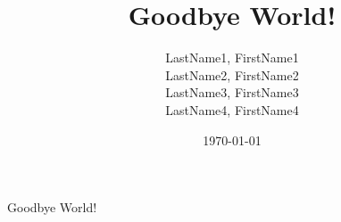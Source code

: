 \documentclass{report}
\author
{
    LastName1, FirstName1\\
    LastName2, FirstName2\\
    LastName3, FirstName3\\
    LastName4, FirstName4
}
\title{Goodbye World!}
\date{\today}
\begin{document}
	\maketitle 
	Goodbye World!
\end{document}
